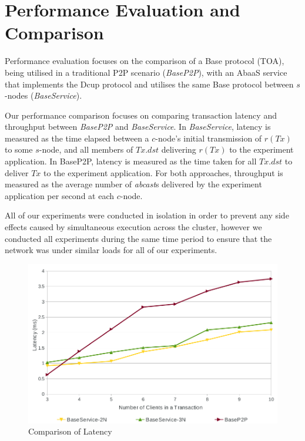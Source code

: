 \section{Performance Evaluation and Comparison}\label{sec:abaas_results}
Performance evaluation focuses on the comparison of a \textsf{Base} protocol (TOA), being utilised in a traditional P2P scenario (\emph{BaseP2P}), with an \textsf{AbaaS} service that implements the \textsf{Dcup} protocol and utilises the same \textsf{Base} protocol between $s$-nodes (\emph{BaseService}).

Our performance comparison focuses on comparing transaction latency and throughput between \emph{BaseP2P} and \emph{BaseService}.  In \emph{BaseService}, latency is measured as the time elapsed between a $c$-node's initial transmission of $r(Tx)$ to some $s$-node, and all members of $Tx.dst$ delivering $r(Tx)$ to the experiment application. In BaseP2P, latency is measured as the time taken for all $Tx.dst$ to deliver $Tx$ to the experiment application. For both approaches, throughput is measured as the average number of \emph{abcast}s delivered by the experiment application per second at each $c$-node.

All of our experiments were conducted in isolation in order to prevent any side effects caused by simultaneous execution across the cluster, however we conducted all experiments during the same time period to ensure that the network was under similar loads for all of our experiments. 

\begin{figure}[htbp!]
 \includegraphics[width=\textwidth,height=\textheight,keepaspectratio]{latency}
 \caption{Comparison of Latency}
 \label{fig:LatencyGraph}
\end{figure}

